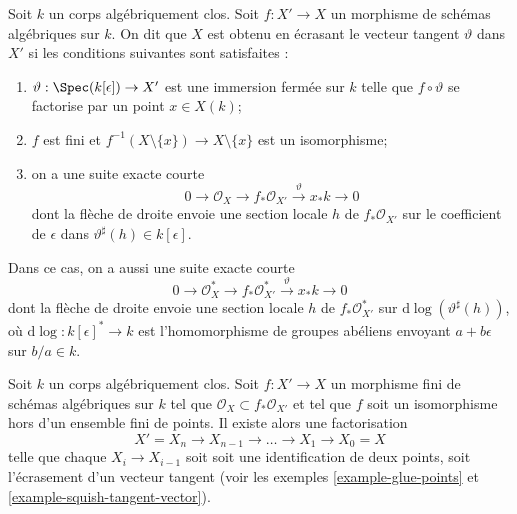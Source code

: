 \begin{example} \label{example-squish-tangent-vector} Soit $k$ un corps algébriquement clos. Soit $f : X' \to X$ un morphisme de schémas algébriques sur $k$. On dit que $X$ est obtenu en écrasant le vecteur tangent $\vartheta$ dans $X'$ si les conditions suivantes sont satisfaites : \begin{enumerate} \item $\vartheta : \Spec(k[\epsilon]) \to X'$ est une immersion fermée sur $k$ telle que $f \circ \vartheta$ se factorise par un point $x \in X(k)$; \item $f$ est fini et $f^{-1}(X \setminus \{x\}) \to X \setminus \{x\}$ est un isomorphisme; \item on a une suite exacte courte $$
0 \to \mathcal{O}_X \to f_*\mathcal{O}_{X'} \xrightarrow{\vartheta} x_*k \to 0
$$ dont la flèche de droite envoie une section locale $h$ de $f_*\mathcal{O}_{X'}$ sur le coefficient de $\epsilon$ dans $\vartheta^\sharp(h) \in k[\epsilon]$. \end{enumerate} Dans ce cas, on a aussi une suite exacte courte $$
0 \to \mathcal{O}_X^* \to f_*\mathcal{O}_{X'}^*
\xrightarrow{\vartheta} x_*k \to 0
$$ dont la flèche de droite envoie une section locale $h$ de $f_*\mathcal{O}_{X'}^*$ sur $\text{d}\log(\vartheta^\sharp(h))$, où $\text{d}\log : k[\epsilon]^* \to k$ est l'homomorphisme de groupes abéliens envoyant $a + b\epsilon$ sur $b/a \in k$.
\end{example}

\begin{lemma}
\label{lemma-factor-almost-isomorphism}
Soit $k$ un corps algébriquement clos. Soit $f : X' \to X$ un morphisme fini de schémas algébriques sur $k$ tel que $\mathcal{O}_X \subset f_*\mathcal{O}_{X'}$ et tel que $f$ soit un isomorphisme hors d'un ensemble fini de points. Il existe alors une factorisation $$
X' = X_n \to X_{n - 1} \to \ldots \to X_1 \to X_0 = X
$$ telle que chaque $X_i \to X_{i - 1}$ soit soit une identification de deux points, soit l'écrasement d'un vecteur tangent (voir les exemples \ref{example-glue-points} et \ref{example-squish-tangent-vector}).
\end{lemma}

